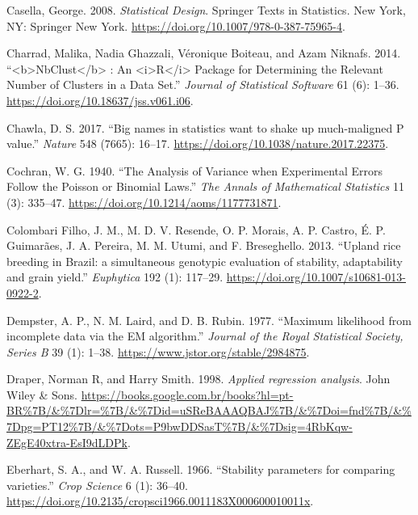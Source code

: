 \documentclass[
]{book}
\numberwithin{equation}{section}
\newlength{\cslhangindent}
\newenvironment{cslreferences}%
  {\setlength{\parindent}{0pt}%
  \everypar{\setlength{\hangindent}{\cslhangindent}}\ignorespaces}%
  {\par}
\begin{document}
\begin{cslreferences}
\leavevmode\hypertarget{ref-Casella2008}{}%
Casella, George. 2008. \emph{Statistical Design}. Springer Texts in Statistics. New York, NY: Springer New York. \url{https://doi.org/10.1007/978-0-387-75965-4}.

\leavevmode\hypertarget{ref-Charrad2014}{}%
Charrad, Malika, Nadia Ghazzali, Véronique Boiteau, and Azam Niknafs. 2014. ``\textless b\textgreater NbClust\textless/b\textgreater{} : An \textless i\textgreater R\textless/i\textgreater{} Package for Determining the Relevant Number of Clusters in a Data Set.'' \emph{Journal of Statistical Software} 61 (6): 1--36. \url{https://doi.org/10.18637/jss.v061.i06}.

\leavevmode\hypertarget{ref-Chawla2017}{}%
Chawla, D. S. 2017. ``Big names in statistics want to shake up much-maligned P value.'' \emph{Nature} 548 (7665): 16--17. \url{https://doi.org/10.1038/nature.2017.22375}.

\leavevmode\hypertarget{ref-Cochran1940}{}%
Cochran, W. G. 1940. ``The Analysis of Variance when Experimental Errors Follow the Poisson or Binomial Laws.'' \emph{The Annals of Mathematical Statistics} 11 (3): 335--47. \url{https://doi.org/10.1214/aoms/1177731871}.

\leavevmode\hypertarget{ref-ColombariFilho2013}{}%
Colombari Filho, J. M., M. D. V. Resende, O. P. Morais, A. P. Castro, É. P. Guimarães, J. A. Pereira, M. M. Utumi, and F. Breseghello. 2013. ``Upland rice breeding in Brazil: a simultaneous genotypic evaluation of stability, adaptability and grain yield.'' \emph{Euphytica} 192 (1): 117--29. \url{https://doi.org/10.1007/s10681-013-0922-2}.

\leavevmode\hypertarget{ref-Dempster1977}{}%
Dempster, A. P., N. M. Laird, and D. B. Rubin. 1977. ``Maximum likelihood from incomplete data via the EM algorithm.'' \emph{Journal of the Royal Statistical Society, Series B} 39 (1): 1--38. \url{https://www.jstor.org/stable/2984875}.

\leavevmode\hypertarget{ref-Draper1998}{}%
Draper, Norman R, and Harry Smith. 1998. \emph{Applied regression analysis}. John Wiley \& Sons. \url{https://books.google.com.br/books?hl=pt-BR\%7B/\&\%7Dlr=\%7B/\&\%7Did=uSReBAAAQBAJ\%7B/\&\%7Doi=fnd\%7B/\&\%7Dpg=PT12\%7B/\&\%7Dots=P9bwDDSasT\%7B/\&\%7Dsig=4RbKqw-ZEgE40xtra-EsI9dLDPk}.

\leavevmode\hypertarget{ref-Eberhart1966}{}%
Eberhart, S. A., and W. A. Russell. 1966. ``Stability parameters for comparing varieties.'' \emph{Crop Science} 6 (1): 36--40. \url{https://doi.org/10.2135/cropsci1966.0011183X000600010011x}.


\end{cslreferences}
\end{document}
